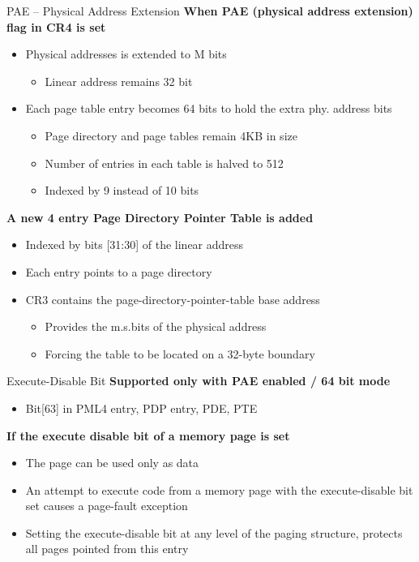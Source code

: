\documentclass[aspectratio=169,12pt]{beamer}
\begin{document}
\begin{frame}{PAE – Physical Address Extension}
\textbf{When PAE (physical address extension) flag in CR4 is set}
\begin{itemize}
\item Physical addresses is extended to M bits
    \begin{itemize}
    \item Linear address remains 32 bit
    \end{itemize}
\item Each page table entry becomes 64 bits to hold the extra phy. address bits
    \begin{itemize}
    \item Page directory and page tables remain 4KB in size
    \item Number of entries in each table is halved to 512
    \item Indexed by 9 instead of 10 bits
    \end{itemize}
\end{itemize}

\textbf{A new 4 entry Page Directory Pointer Table is added}
\begin{itemize}
\item Indexed by bits [31:30] of the linear address
\item Each entry points to a page directory
\item CR3 contains the page-directory-pointer-table base address
    \begin{itemize}
    \item Provides the m.s.bits of the physical address
    \item Forcing the table to be located on a 32-byte boundary
    \end{itemize}
\end{itemize}
\end{frame}

\begin{frame}{Execute-Disable Bit}
\textbf{Supported only with PAE enabled / 64 bit mode}
\begin{itemize}
\item Bit[63] in PML4 entry, PDP entry, PDE, PTE
\end{itemize}

\textbf{If the execute disable bit of a memory page is set}
\begin{itemize}
\item The page can be used only as data
\item An attempt to execute code from a memory page with the execute-disable bit set causes a page-fault exception
\item Setting the execute-disable bit at any level of the paging structure, protects all pages pointed from this entry
\end{itemize}
\end{frame}
\end{document}
